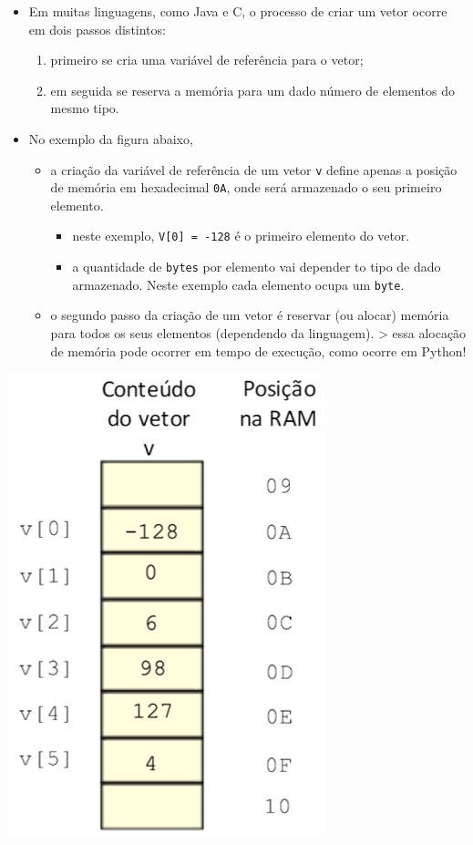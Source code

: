 \documentclass[12pt,a4paper]{article}
\providecommand{\tightlist}{%
      \setlength{\itemsep}{0pt}\setlength{\parskip}{0pt}}
\begin{document}
    \begin{itemize}
\tightlist
\item
  Em muitas linguagens, como Java e C, o processo de criar um vetor
  ocorre em dois passos distintos:

  \begin{enumerate}
  \def\labelenumi{\arabic{enumi}.}
  \tightlist
  \item
    primeiro se cria uma variável de referência para o vetor;
  \item
    em seguida se reserva a memória para um dado número de elementos do
    mesmo tipo.
  \end{enumerate}
\item
  No exemplo da figura abaixo,

  \begin{itemize}
  \tightlist
  \item
    a criação da variável de referência de um vetor \texttt{v} define
    apenas a posição de memória em hexadecimal \texttt{0A}, onde será
    armazenado o seu primeiro elemento.

    \begin{itemize}
    \tightlist
    \item
      neste exemplo, \texttt{V{[}0{]}\ =\ -128} é o primeiro elemento do
      vetor.
    \item
      a quantidade de \texttt{bytes} por elemento vai depender to tipo
      de dado armazenado. Neste exemplo cada elemento ocupa um
      \texttt{byte}.
    \end{itemize}
  \item
    o segundo passo da criação de um vetor é reservar (ou alocar)
    memória para todos os seus elementos (dependendo da linguagem).
    \textgreater{} essa alocação de memória pode ocorrer em tempo de
    execução, como ocorre em Python!
  \end{itemize}
\end{itemize}

\includegraphics{"figs/image33.png"}
\end{document}
